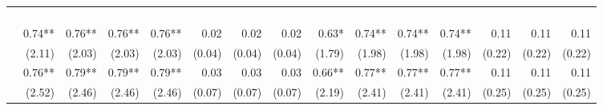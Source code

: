     \begin{tabularx}{1.45\textwidth}{lRRRRRRRRRRRRRR}
        \toprule
        &  &  \\ \cmidrule(rl){2-8} \cmidrule(rl){9-15}
        &  &  &  &  \\
        \cmidrule(rl){2-5} \cmidrule(rl){6-8} \cmidrule(rl){9-12} \cmidrule(rl){13-15}
        &  &  &  &  &  &  &  &  &  &  &  &  &  &  \\
		\midrule
		 \\[\panelspacing]
		 & \num{0.74}**\phantom{*)} & \num{0.76}**\phantom{*)} & \num{0.76}**\phantom{*)} & \num{0.76}**\phantom{*)} & \num{0.02}\phantom{***)} & \num{0.02}\phantom{***)} & \num{0.02}\phantom{***)} & \num{0.63}*\phantom{**)} & \num{0.74}**\phantom{*)} & \num{0.74}**\phantom{*)} & \num{0.74}**\phantom{*)} & \num{0.11}\phantom{***)} & \num{0.11}\phantom{***)} & \num{0.11}\phantom{***)} \\
		 & (\num{2.11})\phantom{***} & (\num{2.03})\phantom{***} & (\num{2.03})\phantom{***} & (\num{2.03})\phantom{***} & (\num{0.04})\phantom{***} & (\num{0.04})\phantom{***} & (\num{0.04})\phantom{***} & (\num{1.79})\phantom{***} & (\num{1.98})\phantom{***} & (\num{1.98})\phantom{***} & (\num{1.98})\phantom{***} & (\num{0.22})\phantom{***} & (\num{0.22})\phantom{***} & (\num{0.22})\phantom{***} \\ [\dspacing]
		 & \num{0.76}**\phantom{*)} & \num{0.79}**\phantom{*)} & \num{0.79}**\phantom{*)} & \num{0.79}**\phantom{*)} & \num{0.03}\phantom{***)} & \num{0.03}\phantom{***)} & \num{0.03}\phantom{***)} & \num{0.66}**\phantom{*)} & \num{0.77}**\phantom{*)} & \num{0.77}**\phantom{*)} & \num{0.77}**\phantom{*)} & \num{0.11}\phantom{***)} & \num{0.11}\phantom{***)} & \num{0.11}\phantom{***)} \\
		 & (\num{2.52})\phantom{***} & (\num{2.46})\phantom{***} & (\num{2.46})\phantom{***} & (\num{2.46})\phantom{***} & (\num{0.07})\phantom{***} & (\num{0.07})\phantom{***} & (\num{0.07})\phantom{***} & (\num{2.19})\phantom{***} & (\num{2.41})\phantom{***} & (\num{2.41})\phantom{***} & (\num{2.41})\phantom{***} & (\num{0.25})\phantom{***} & (\num{0.25})\phantom{***} & (\num{0.25})\phantom{***} \\ [\dspacing]

\end{tabularx}
